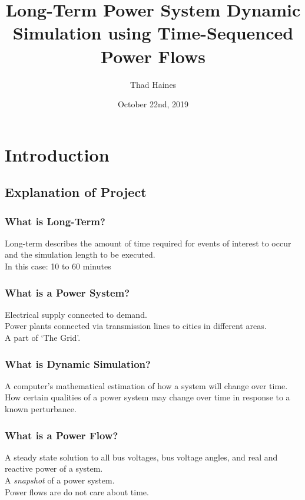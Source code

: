 \documentclass[14pt, unknownkeysallowed]{beamer}
\title{Long-Term Power System Dynamic Simulation using Time-Sequenced \\ Power Flows}
\author{Thad Haines}
\institute[MT TECH]{Montana Technological University - Master's Thesis Research Project}
\date{October 22nd, 2019}
\begin{document}
	
\begin{frame}
	\titlepage
\end{frame}

\section{Introduction}
\subsection{Explanation of Project}
\begin{frame}
\frametitle{What is Long-Term?}
Long-term describes the amount of time required for events of interest to occur and the simulation length to be executed. \\
\vspace{1em}
In this case: 10 to 60 minutes
\end{frame}
\begin{frame}
\frametitle{What is a Power System?}
Electrical supply connected to demand.\\
\vspace{1em}
Power plants connected via transmission lines to cities in different areas. \\
\vspace{1em}
A part of `The Grid'.
\end{frame}
\begin{frame}
\frametitle{What is Dynamic Simulation?}
A computer's mathematical estimation of how a system will change over time.\\%
\vspace{1em}
How certain qualities of a power system may change over time in response to a known perturbance.
\end{frame}
\begin{frame}
\frametitle{What is a Power Flow?}
A steady state solution to all bus voltages, bus voltage angles, and real  and reactive power of a system.\\
\vspace{1em}
A \emph{snapshot} of a power system. \\%
\vspace{1em}
Power flows are do not care about time.
\end{frame}
\end{document}
